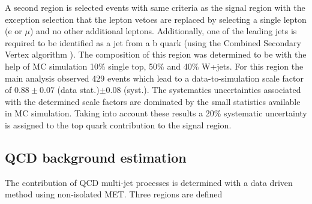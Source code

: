 A second region is selected events with same criteria as the signal region with the exception selection  that the lepton vetoes are replaced by selecting a single lepton (e or $\mu$) and no other additional leptons. Additionally, one of the leading jets is required to be identified as a jet from a b quark (using the Combined Secondary Vertex algorithm \cite{ARTICLE:CMSIdentificationOfbQuarks}). The composition of this region was determined to be with the help of \gls{MC} simulation 10\% single top, 50\% \ttbar and 40\% W+jets. For this region the main analysis observed 429 events which lead to a data-to-simulation scale factor of $0.88\pm 0.07$ (data stat.)$ \pm 0.08$ (syst.). The systematics uncertainties associated with the determined scale factors are dominated by the small statistics available in \gls{MC} simulation. Taking into account these results a 20\% systematic uncertainty is assigned to the top quark contribution to the signal region. 

\subsection{QCD background estimation}
\label{SECTION:ParkedDataAnalysis_ControlRegions_QCDBackground}


The contribution of \gls{QCD} multi-jet processes is determined with a data driven method using non-isolated \gls{MET}. Three regions are defined

